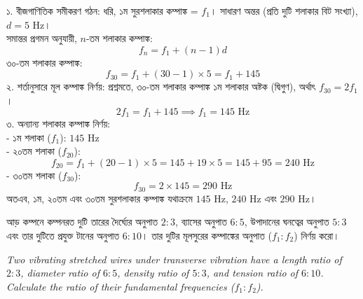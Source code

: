 \documentclass[12pt, a4paper]{article}
\begin{document}
\vspace{1em}

\begin{tcolorbox}[solutionbox={সমাধান (Solution)}]
\noindent
১. বীজগাণিতিক সমীকরণ গঠন: ধরি, ১ম সুরশলাকার কম্পাঙ্ক = $f_1$। সাধারণ অন্তর (প্রতি দুটি শলাকার বিট সংখ্যা), $d = 5\text{ Hz}$। \\
সমান্তর প্রগমন অনুযায়ী, $n$-তম শলাকার কম্পাঙ্ক:
\[ f_n = f_1 + (n - 1)d \]
৩০-তম শলাকার কম্পাঙ্ক:
\[ f_{30} = f_1 + (30 - 1) \times 5 = f_1 + 145 \]
২. শর্তানুসারে মূল কম্পাঙ্ক নির্ণয়: প্রশ্নমতে, ৩০-তম শলাকার কম্পাঙ্ক ১ম শলাকার অষ্টক (দ্বিগুণ), অর্থাৎ $f_{30} = 2 f_1$।
\[ 2 f_1 = f_1 + 145 \implies f_1 = 145\text{ Hz} \]
৩. অন্যান্য শলাকার কম্পাঙ্ক নির্ণয়: \\
- ১ম শলাকা ($f_1$): $145\text{ Hz}$ \\
- ২০তম শলাকা ($f_{20}$):
\[ f_{20} = f_1 + (20 - 1) \times 5 = 145 + 19 \times 5 = 145 + 95 = 240\text{ Hz} \]
- ৩০তম শলাকা ($f_{30}$):
\[ f_{30} = 2 \times 145 = 290\text{ Hz} \]
অতএব, ১ম, ২০তম এবং ৩০তম সুরশলাকার কম্পাঙ্ক যথাক্রমে $145\text{ Hz}$, $240\text{ Hz}$ এবং $290\text{ Hz}$।
\end{tcolorbox}

\vspace{1.5em}

\begin{tcolorbox}[questionbox={প্রশ্ন (Question) 6}]
\noindent
আড় কম্পনে কম্পনরত দুটি তারের দৈর্ঘ্যের অনুপাত $2:3$, ব্যাসের অনুপাত $6:5$, উপাদানের ঘনত্বের অনুপাত $5:3$ এবং তার দুটিতে প্রযুক্ত টানের অনুপাত $6:10$। তার দুটির মূলসুরের কম্পাঙ্কের অনুপাত ($f_1 : f_2$) নির্ণয় করো।

\vspace{0.8em}
\begin{english}
\noindent\textit{\color{darkgray}
Two vibrating stretched wires under transverse vibration have a length ratio of $2:3$, diameter ratio of $6:5$, density ratio of $5:3$, and tension ratio of $6:10$. Calculate the ratio of their fundamental frequencies ($f_1 : f_2$).
}
\end{english}
\end{tcolorbox}

\vspace{1em}
\end{document}
